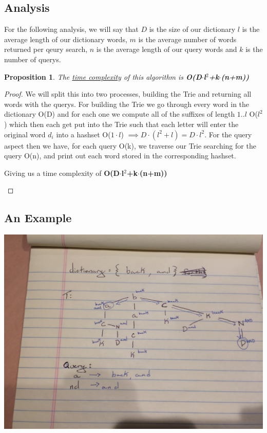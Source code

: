 \documentclass[12pt]{article}
\newtheorem{proposition}[theorem]{Proposition}
\begin{document}
\subsection{Analysis}
For the following analysis, we will say that $D$ is the size of our dictionary $l$ is the average length of our
dictionary words, $m$ is the average number of words returned per qeury search,  $n$ is the average length
of our query words and $k$ is the number of querys.

\begin{proposition}
\label{numq}
The \underline{time complexity} of this algorithm is \textbf{O(D$\cdot$l$^2$+k$\cdot$(n+m))}
\end{proposition}

\begin{proof}
We will split this into two processes, building the Trie and returning all words with the querys.
For building the Trie we go through every word in the dictionary O(D) and for each one we compute
all of the suffixes of length $1..l$ O($l^2$) which then each get put into the Trie such that
each letter will enter the original word $d_i$ into a hashset O($1\cdot l$) $\implies D\cdot (l^2 + l) = D\cdot l^2$.
For the query aspect then we have, for each query O(k), we traverse our Trie searching for the query O(n),
and print out each word stored in the corresponding hashset.

\begin{center}
    Giving us a time complexity of \textbf{O(D$\cdot$l$^2$+k$\cdot$(n+m))}
\end{center}
\end{proof}


\subsection{An Example}
\includegraphics[width=\textwidth]{example2}
\end{document}
